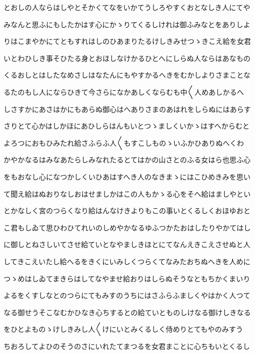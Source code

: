 \documentclass[a4paper,11pt,landscape]{ltjtarticle}
\begin{document}
\par\medskip
とおしの人ならはしやとそかくてなをいかてうしろやすくおとなしき人にてや
\par\medskip
みなんと思ふにもしたかはす心にかゝりてくるしけれは御ふみなとをありしよ
\par\medskip
りはこまやかにてともすれはしのひあまりたるけしきみせつゝきこえ給を女君
\par\medskip
いとわひしき事そひたる身とおほしなけかるひとへにしらぬ人ならはあなもの
\par\medskip
くるおしとはしたなめさしはなたんにもやすかるへきをむかしよりさまことな
\par\medskip
るたのもし人にならひきて今さらになかあしくならむも中〱人めあしかるへ
\par\medskip
しさすかにあさはかにもあらぬ御心はへありさまのあはれをしらぬにはあらす
\par\medskip
さりとて心かはしかほにあひしらはんもいとつゝましくいかゝはすへからむと
\par\medskip
よろつにおもひみたれ給さふらふ人〱もすこしものゝいふかひありぬへくわ
\par\medskip
かやかなるはみなあたらしみなれたるとてはかの山さとのふる女はら也思ふ心
\par\medskip
をもおなし心になつかしくいひあはすへき人のなきまゝにはこひめきみを思い
\par\medskip
て聞え給はぬおりなしおはせましかはこの人もかゝる心をそへ給はましやとい
\par\medskip
とかなしく宮のつらくなり給はんなけきよりもこの事いとくるしくおほゆおと
\par\medskip
こ君もしゐて思ひわひてれいのしめやかなるゆふつかたおはしたりやかてはし
\par\medskip
に御しとねさしいてさせ給ていとなやましきほとにてなんえきこえさせぬと人
\par\medskip
してきこえいたし給へるをきくにいみしくつらくてなみたおちぬへきを人めに
\par\medskip
つゝめはしゐてまきらはしてなやませ給おりはしらぬそうなともちかくまいり
\par\medskip
よるをくすしなとのつらにてもみすのうちにはさふらふましくやはかく人つて
\par\medskip
なる御せうそこなむかひなき心ちするとの給ていとものしけなる御けしきなる
\par\medskip
をひとよものゝけしきみし人〱けにいとみくるしく侍めりとてもやのみすう
\par\medskip
ちおろしてよひのそうのさにいれたてまつるを女君まことに心ちもいとくるし
\par\medskip
\end{document}
